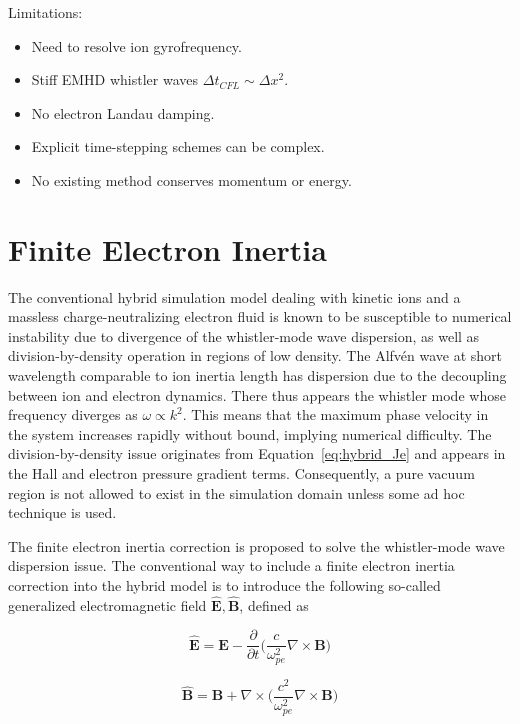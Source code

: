 \documentclass[
  notoc %
]{tufte-book}
\providecommand{\tightlist}{%
  \setlength{\itemsep}{0pt}\setlength{\parskip}{0pt}
}
\begin{document}
Limitations:

\begin{itemize}
\tightlist
\item
  Need to resolve ion gyrofrequency.
\item
  Stiff EMHD whistler waves \(\Delta t_{CFL}\sim \Delta x^2\).
\item
  No electron Landau damping.
\item
  Explicit time-stepping schemes can be complex.
\item
  No existing method conserves momentum or energy.
\end{itemize}

\hypertarget{sec:finite_e_mass}{%
\section{Finite Electron Inertia}\label{sec:finite_e_mass}}

The conventional hybrid simulation model dealing with kinetic ions and a
massless charge-neutralizing electron fluid is known to be susceptible
to numerical instability due to divergence of the whistler-mode wave
dispersion, as well as division-by-density operation in regions of low
density. The Alfvén wave at short wavelength comparable to ion inertia
length has dispersion due to the decoupling between ion and electron
dynamics. There thus appears the whistler mode whose frequency diverges
as \(\omega \propto k^2\). This means that the maximum phase velocity in
the system increases rapidly without bound, implying numerical
difficulty. The division-by-density issue originates from
Equation~\ref{eq:hybrid_Je} and appears in the Hall and electron
pressure gradient terms. Consequently, a pure vacuum region is not
allowed to exist in the simulation domain unless some ad hoc technique
is used.

The finite electron inertia correction is proposed to solve the
whistler-mode wave dispersion issue. The conventional way to include a
finite electron inertia correction into the hybrid model is to introduce
the following so-called generalized electromagnetic field
\(\widehat{\mathbf{E}}, \widehat{\mathbf{B}}\), defined as

\[
\widehat{\mathbf{E}} = \mathbf{E} - \frac{\partial}{\partial t}\big( \frac{c}{\omega_{pe}^2}\nabla\times\mathbf{B} \big)
\]

\[
\widehat{\mathbf{B}} = \mathbf{B} + \nabla\times\big( \frac{c^2}{\omega_{pe}^2}\nabla\times\mathbf{B} \big)
\]
\end{document}
